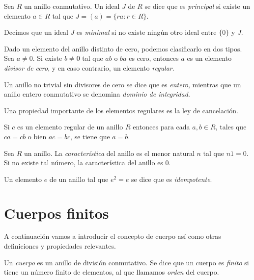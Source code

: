 \begin{definition}
  Sea \(R\) un anillo conmutativo. Un ideal \(J\) de \(R\) se dice que es \textit{principal} si existe un elemento \(a \in R\) tal que \(J = (a) = \{ra : r \in R\}\).
\end{definition}


Decimos que un ideal \(J\) es \textit{minimal} si no existe ningún otro ideal entre \(\{0\}\) y \(J\).

Dado un elemento del anillo distinto de cero, podemos clasificarlo en dos tipos. 
Sea \(a \neq 0\). 
Si existe \(b \neq 0\) tal que \(ab\) o \(ba\) es cero, entonces \(a\) es un elemento \textit{divisor de cero}, y en caso contrario, un elemento \textit{regular}.

Un anillo no trivial sin divisores de cero se dice que es \textit{entero}, mientras que un anillo entero conmutativo se denomina \textit{dominio de integridad}.

Una propiedad importante de los elementos regulares es la ley de cancelación.
\begin{proposition}
  Si \(c\) es un elemento regular de un anillo \(R\) entonces para cada \(a, b \in R\), tales que \(ca = cb\) o bien \(ac = bc\), se tiene que \(a = b\).
\end{proposition}

\begin{definition}
  Sea \(R\) un anillo. La \textit{característica} del anillo es el menor natural \(n\) tal que \(n1 = 0\).
  Si no existe tal número, la característica del anillo es \(0\).  
\end{definition}

\begin{definition}
  Un elemento \(e\) de un anillo tal que \(e^2 = e\) se dice que es \textit{idempotente}.
\end{definition}

\section{Cuerpos finitos}

A continuación vamos a introducir el concepto de cuerpo así como otras definiciones y propiedades relevantes.

\begin{definition}
  Un \textit{cuerpo} es un anillo de división conmutativo.
  Se dice que un cuerpo es \textit{finito} si tiene un número finito de elementos, al que llamamos \textit{orden} del cuerpo.
\end{definition}

